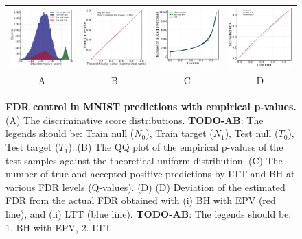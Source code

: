 \documentclass{article}
\newcommand{\todo}[2]{{\color{red} {\bf TODO-#1}: #2}}
\begin{document}
\begin{figure}
	\centering
	\begin{tabular}{cccc}
		\includegraphics[width=1.7in]{img/cls_overview.png}&
		\includegraphics[width=1.7in]{img/cnn_QQ_classical_lin.png} &
		\includegraphics[width=1.7in]{img/cnn_classical_fdr_control.png} &
		\includegraphics[width=1.7in]{img/cnn_FDRQQ_classical.png} \\
			
		A & B & C & D \\
%
	\end{tabular}
	\caption{{\bf FDR control in MNIST predictions with empirical p-values. } (A) The discriminative score distributions. \todo{AB}{The legends should be: Train null ($N_0$), Train target ($N_1$), Test null ($T_0$), Test target ($T_1$).}.(B) The QQ plot of the empirical p-values of the test samples against the theoretical uniform distribution. (C) The number of true and accepted positive predictions by LTT and BH at various FDR levels (Q-values).  (D)  (D) Deviation of the estimated FDR from the actual FDR obtained with (i) BH with EPV (red line), and (ii) LTT (blue line). \todo{AB}{The legends should be: 1. BH with EPV, 2. LTT} }
	\label{fig:binary}
\end{figure}
 
\end{document}
